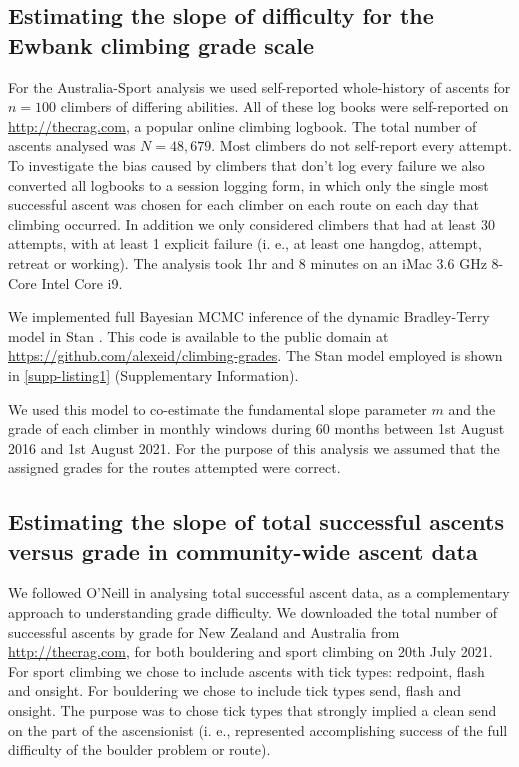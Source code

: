 \documentclass{article}
\begin{document}
{\subsection*{Estimating the slope of difficulty for the Ewbank climbing grade scale}

For the Australia-Sport analysis we used self-reported whole-history of ascents for $n=100$ climbers of differing abilities. All of these log books were self-reported on \url{http://thecrag.com}, a popular online climbing logbook. The total number of ascents analysed was $N=48,679$. Most climbers do not self-report every attempt. To investigate the bias caused by climbers that don't log every failure we also converted all logbooks to a session logging form, in which only the single most successful ascent was chosen for each climber on each route on each day that climbing occurred. In addition we only considered climbers that had at least 30 attempts, with at least 1 explicit failure (i. e., at least one \gls{hangdog}, attempt, retreat or working). The analysis took 1hr and 8 minutes on an iMac 3.6 GHz 8-Core Intel Core i9.

We implemented full Bayesian MCMC inference of the dynamic Bradley-Terry model in Stan \cite{carpenter2017stan}. This code is available to the public domain at \url{https://github.com/alexeid/climbing-grades}.
The Stan model employed is shown in \cref{supp-listing1} (Supplementary Information).

We used this model to co-estimate the fundamental slope parameter $m$ and the grade of each climber in monthly windows during 60 months between 1st August 2016 and 1st August 2021. For the purpose of this analysis we assumed that the assigned grades for the routes attempted were correct.

\subsection*{Estimating the slope of total successful ascents versus grade in community-wide ascent data}

We followed O'Neill \cite{oneill2002} in analysing total successful ascent data, as a complementary approach to understanding grade difficulty. We downloaded the total number of successful ascents by grade for New Zealand and Australia from \url{http://thecrag.com}, for both bouldering and sport climbing on 20th July 2021. For sport climbing we chose to include ascents with tick types: \gls{redpoint}, \gls{flash} and \gls{onsight}. For bouldering we chose to include tick types \gls{send}, \gls{flash} and \gls{onsight}. The purpose was to chose tick types that strongly implied a clean send on the part of the ascensionist (i. e., represented accomplishing success of the full difficulty of the boulder problem or route).

}
\end{document}
